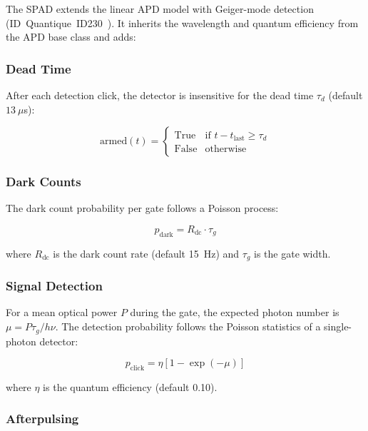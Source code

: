 \documentclass[3p,times,preprint]{elsarticle}
\begin{document}
The SPAD extends the linear APD model with Geiger-mode detection
(ID~Quantique~ID230~\cite{id230}).  It inherits the wavelength and
quantum efficiency from the APD base class and adds:

\subsubsection{Dead Time}

After each detection click, the detector is insensitive for the dead
time $\tau_d$ (default $13~\mu$s):

\begin{equation}
  \text{armed}(t) = \begin{cases}
    \text{True} & \text{if } t - t_{\text{last}} \ge \tau_d \\
    \text{False} & \text{otherwise}
  \end{cases}
\end{equation}

\subsubsection{Dark Counts}

The dark count probability per gate follows a Poisson process:

\begin{equation}
  p_{\text{dark}} = R_{\text{dc}} \cdot \tau_g
\end{equation}

where $R_{\text{dc}}$ is the dark count rate (default 15~Hz) and
$\tau_g$ is the gate width.

\subsubsection{Signal Detection}

For a mean optical power $P$ during the gate, the expected photon number
is $\mu = P\tau_g / h\nu$.  The detection probability follows the
Poisson statistics of a single-photon detector:

\begin{equation}
  p_{\text{click}} = \eta\left[1 - \exp(-\mu)\right]
\end{equation}

where $\eta$ is the quantum efficiency (default 0.10).

\subsubsection{Afterpulsing}
\end{document}
